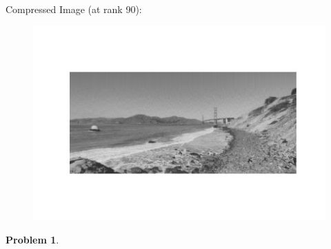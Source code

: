 \documentclass[11pt]{article}
\theoremstyle{definition}
\theoremstyle{case}
\theoremstyle{theorem}
\newtheorem{prob}{Problem}
\begin{document}
Compressed Image (at rank 90):

\begin{figure}[h!]
  \centering
  \includegraphics[totalheight=6cm]{images/sf-compressed.jpg}
\end{figure}

\newpage

\begin{prob}
\end{prob}
\end{document}
